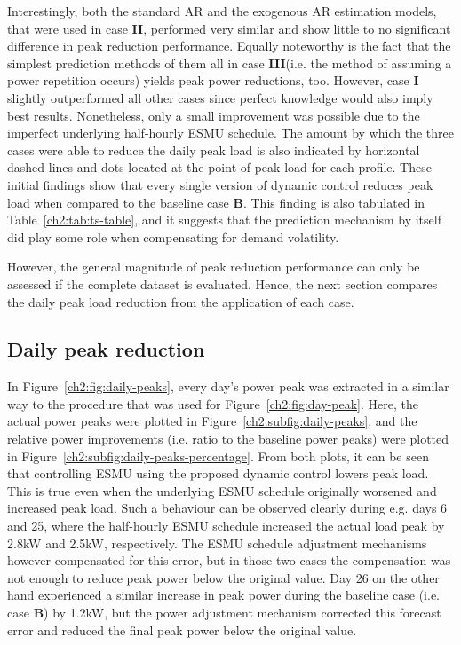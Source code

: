 Interestingly, both the standard AR and the exogenous AR estimation models, that were used in case \textbf{II}, performed very similar and show little to no significant difference in peak reduction performance.
Equally noteworthy is the fact that the simplest prediction methods of them all in case \textbf{III}(i.e. the method of assuming a power repetition occurs) yields peak power reductions, too.
However, case \textbf{I} slightly outperformed all other cases since perfect knowledge would also imply best results.
Nonetheless, only a small improvement was possible due to the imperfect underlying half-hourly ESMU schedule.
The amount by which the three cases were able to reduce the daily peak load is also indicated by horizontal dashed lines and dots located at the point of peak load for each profile.
These initial findings show that every single version of dynamic control reduces peak load when compared to the baseline case \textbf{B}.
This finding is also tabulated in Table~\ref{ch2:tab:ts-table}, and it suggests that the prediction mechanism by itself did play some role when compensating for demand volatility.



However, the general magnitude of peak reduction performance can only be assessed if the complete dataset is evaluated.
Hence, the next section compares the daily peak load reduction from the application of each case.

\subsection{Daily peak reduction}



In Figure~\ref{ch2:fig:daily-peaks}, every day's power peak was extracted in a similar way to the procedure that was used for Figure~\ref{ch2:fig:day-peak}.
Here, the actual power peaks were plotted in Figure~\ref{ch2:subfig:daily-peaks}, and the relative power improvements (i.e. ratio to the baseline power peaks) were plotted in Figure~\ref{ch2:subfig:daily-peaks-percentage}.
From both plots, it can be seen that controlling ESMU using the proposed dynamic control lowers peak load.
This is true even when the underlying ESMU schedule originally worsened and increased peak load.
Such a behaviour can be observed clearly during e.g. days 6 and 25, where the half-hourly ESMU schedule increased the actual load peak by 2.8kW and 2.5kW, respectively.
The ESMU schedule adjustment mechanisms however compensated for this error, but in those two cases the compensation was not enough to reduce peak power below the original value.
Day 26 on the other hand experienced a similar increase in peak power during the baseline case (i.e. case \textbf{B}) by 1.2kW, but the power adjustment mechanism corrected this forecast error and reduced the final peak power below the original value.

